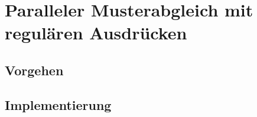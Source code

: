 \chapter{Paralleler Musterabgleich mit regulären Ausdrücken}

\section{Vorgehen}

\section{Implementierung}